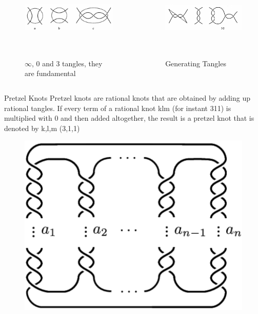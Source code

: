 \begin{frame}
\begin{columns}[T]
\begin{column}{.48\textwidth}
\begin{figure}
    \centering
    \includegraphics[width=0.9\linewidth,height=4cm]{images/basictangles.png}
    \caption{$\infty$, 0 and 3 tangles, they are \centering fundamental}
    \label{basictangles}
\end{figure}
\cite{adams2004knot}
\end{column}
\begin{column}{.48\textwidth}
\begin{figure}[h]
    \centering
    \includegraphics[width=0.9\linewidth,height=4cm]{images/tangleproduce.png}
    \caption{Generating Tangles}
    \label{generating}
\end{figure}
\end{column}
\end{columns}
\end{frame}
\begin{frame}{Pretzel Knots}
Pretzel knots are rational knots that are obtained by adding up rational tangles. If every term of a rational knot klm (for instant 311) is multiplied with 0 and then added altogether, the result is a pretzel knot that is denoted by k,l,m (3,1,1)
\begin{figure}
    \centering
    \includegraphics[width=0.4\linewidth]{images/pretzel.png}
    \label{pretzel}
    \cite{article2}
\end{figure}
\end{frame}
